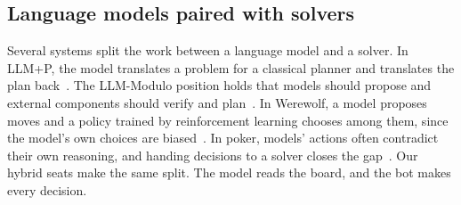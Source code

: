 \subsection{Language models paired with solvers}

Several systems split the work between a language model and a solver. In LLM+P, the model translates a problem for a classical planner and translates the plan back~\citep{liu2023llmp}. The LLM-Modulo position holds that models should propose and external components should verify and plan~\citep{kambhampati2024llmmodulo}. In Werewolf, a model proposes moves and a policy trained by reinforcement learning chooses among them, since the model's own choices are biased~\citep{xu2024werewolf}. In poker, models' actions often contradict their own reasoning, and handing decisions to a solver closes the gap~\citep{lin2026toolpoker}. Our hybrid seats make the same split. The model reads the board, and the bot makes every decision.
